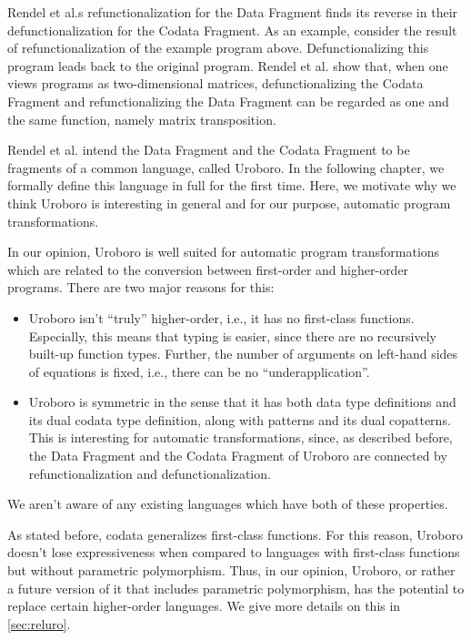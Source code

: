 Rendel et al.s\cite{rendel15automatic} refunctionalization for the Data Fragment finds its reverse in their defunctionalization for the Codata Fragment. As an example, consider the result of refunctionalization of the example program above. Defunctionalizing this program leads back to the original program. Rendel et al. show that, when one views programs as two-dimensional matrices, defunctionalizing the Codata Fragment and refunctionalizing the Data Fragment can be regarded as one and the same function, namely matrix transposition.

Rendel et al. intend the Data Fragment and the Codata Fragment to be fragments of a common language, called Uroboro. In the following chapter, we formally define this language in full for the first time. Here, we motivate why we think Uroboro is interesting in general and for our purpose, automatic program transformations.

In our opinion, Uroboro is well suited for automatic program transformations which are related to the conversion between first-order and higher-order programs. There are two major reasons for this:
\begin{itemize}
\item Uroboro isn't ``truly'' higher-order, i.e., it has no first-class functions. Especially, this means that typing is easier, since there are no recursively built-up function types. Further, the number of arguments on left-hand sides of equations is fixed, i.e., there can be no ``underapplication''.

\item Uroboro is symmetric in the sense that it has both data type definitions and its dual codata type definition, along with patterns and its dual copatterns. This is interesting for automatic transformations, since, as described before, the Data Fragment and the Codata Fragment of Uroboro are connected by refunctionalization and defunctionalization.
\end{itemize}
We aren't aware of any existing languages which have both of these properties.

As stated before, codata generalizes first-class functions. For this reason, Uroboro doesn't lose expressiveness when compared to languages with first-class functions but without parametric polymorphism. Thus, in our opinion, Uroboro, or rather a future version of it that includes parametric polymorphism, has the potential to replace certain higher-order languages. We give more details on this in \autoref{sec:reluro}.


